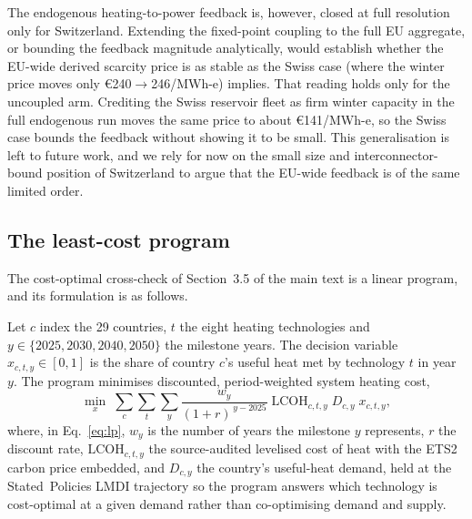 The endogenous heating-to-power feedback is, however, closed at full resolution only
for Switzerland. Extending the fixed-point coupling to the full EU aggregate, or bounding
the feedback magnitude analytically, would establish whether the EU-wide derived scarcity
price is as stable as the Swiss case (where the winter price moves only \euro{}240$\to$246/MWh-e) implies. That reading holds only for the uncoupled arm. Crediting the Swiss reservoir fleet as firm winter capacity in the full endogenous run moves the same price to about \euro{}141/MWh-e, so the Swiss case bounds the feedback without showing it to be small. This generalisation is left to future work, and we
rely for now on the small size and interconnector-bound position of Switzerland to
argue that the EU-wide feedback is of the same limited order.

\subsection{The least-cost program}
\label{sec:method:costopt}

The cost-optimal cross-check of Section~3.5 of the main text is a linear program, and its
formulation is as follows.

Let $c$ index the 29 countries, $t$ the eight heating technologies and
$y \in \{2025, 2030, 2040, 2050\}$ the milestone years. The decision variable
$x_{c,t,y} \in [0,1]$ is the share of country $c$'s useful heat met by technology $t$ in year
$y$. The program minimises discounted, period-weighted system heating cost,
%
\begin{equation}
 \min_{x} \; \sum_{c}\sum_{t}\sum_{y}
 \frac{w_{y}}{(1+r)^{\,y-2025}}\;
 \mathrm{LCOH}_{c,t,y}\; D_{c,y}\; x_{c,t,y},
 \label{eq:lp}
\end{equation}
%
where, in Eq.~\eqref{eq:lp}, $w_{y}$ is the number of years the milestone $y$ represents,
$r$ the discount rate,
$\mathrm{LCOH}_{c,t,y}$ the source-audited levelised cost of heat with the ETS2 carbon price
embedded, and $D_{c,y}$ the country's useful-heat demand, held at the Stated~Policies LMDI
trajectory so the program answers which technology is cost-optimal at a given demand rather
than co-optimising demand and supply.

